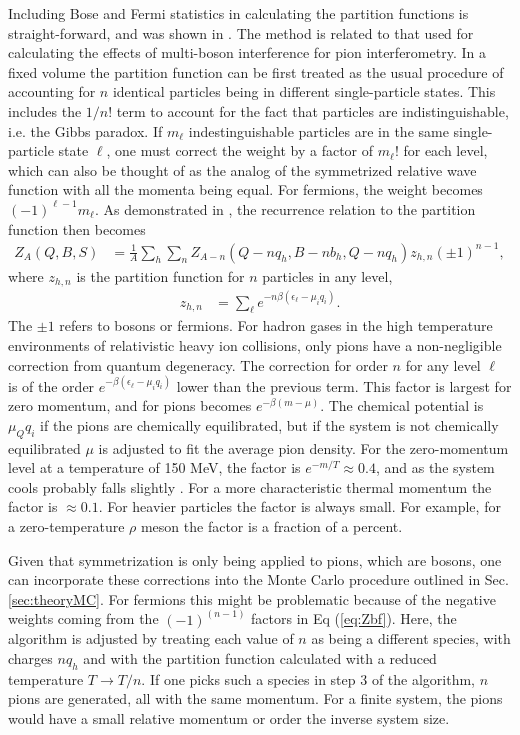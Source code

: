 \documentclass[aps,prc,nofootinbib,showpacs,superscriptaddress,groupedaddress]{revtex4-1}
\begin{document}
Including Bose and Fermi statistics in calculating the partition functions is straight-forward, and was shown in \cite{}. The method is related to that used for calculating the effects of multi-boson interference for pion interferometry. In a fixed volume the partition function can be first treated as the usual procedure of accounting for $n$ identical particles being in different single-particle states. This includes the $1/n!$ term to account for the fact that particles are indistinguishable, i.e. the Gibbs paradox. If $m_\ell$ indestinguishable particles are in the same single-particle state $\ell$, one must correct the weight by a factor of $m_\ell!$ for each level, which can also be thought of as the analog of the symmetrized relative wave function with all the momenta being equal. For fermions, the weight becomes $(-1)^{\ell-1}m_\ell$. As demonstrated in \cite{}, the recurrence relation to the partition function then becomes
\begin{eqnarray}\label{eq:Zbf}
Z_{A}(Q,B,S)&=\frac{1}{A}\sum_h \sum_n Z_{A-n}(Q-nq_h,B-nb_h,Q-nq_h)z_{h,n}(\pm 1)^{n-1},
\end{eqnarray}
where $z_{h,n}$ is the partition function for $n$ particles in any level, 
\begin{eqnarray}
z_{h,n}&=\sum_\ell e^{-n\beta(\epsilon_\ell-\mu_iq_i)}.
\end{eqnarray}
The $\pm 1$ refers to bosons or fermions. For hadron gases in the high temperature environments of relativistic heavy ion collisions, only pions have a non-negligible correction from quantum degeneracy. The correction for order $n$ for any level $\ell$ is of the order $e^{-\beta(\epsilon_\ell-\mu_iq_i)}$ lower than the previous term. This factor is largest for zero momentum, and for pions becomes $e^{-\beta(m-\mu)}$. The chemical potential is $\mu_Q q_i$ if the pions are chemically equilibrated, but if the system is not chemically equilibrated $\mu$ is adjusted to fit the average pion density. For the zero-momentum level at a temperature of 150 MeV, the factor is $e^{-m/T}\approx 0.4$, and as the system cools probably falls slightly \cite{gong}. For a more characteristic thermal momentum the factor is $\approx 0.1$. For heavier particles the factor is always small. For example, for a zero-temperature $\rho$ meson the factor is a fraction of a percent.

Given that symmetrization is only being applied to pions, which are bosons, one can incorporate these corrections into the Monte Carlo procedure outlined in Sec. \ref{sec:theoryMC}. For fermions this might be problematic because of the negative weights coming from the $(-1)^(n-1)$ factors in Eq (\ref{eq:Zbf}). Here, the algorithm is adjusted by treating each value of $n$ as being a different species, with charges $nq_h$ and with the partition function calculated with a reduced temperature $T\rightarrow T/n$. If one picks such a species in step 3 of the algorithm, $n$ pions are generated, all with the same momentum. For a finite system, the pions would have a small relative momentum or order the inverse system size.
\end{document}
